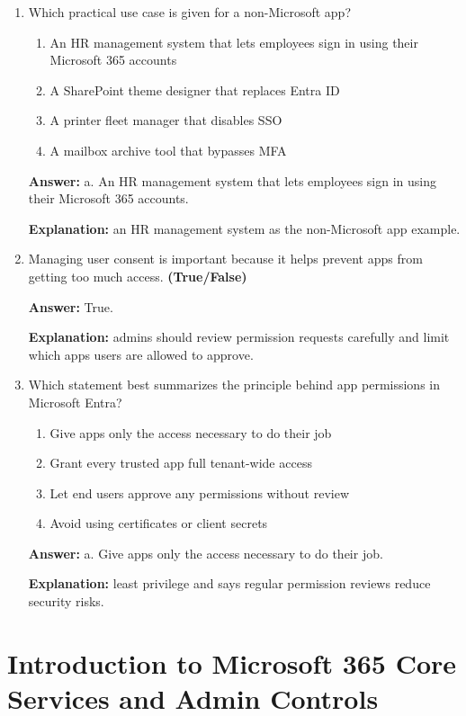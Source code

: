 \documentclass[10pt]{article}
\begin{document}
\begin{enumerate}[leftmargin=*]
\item Which practical use case is given for a non-Microsoft app?
\begin{enumerate}[label=\alph*., leftmargin=1.5em]
\item An HR management system that lets employees sign in using their Microsoft 365 accounts
\item A SharePoint theme designer that replaces Entra ID
\item A printer fleet manager that disables SSO
\item A mailbox archive tool that bypasses MFA
\end{enumerate}
\textbf{Answer:} a. An HR management system that lets employees sign in using their Microsoft 365 accounts.

\textbf{Explanation:} an HR management system as the non-Microsoft app example.

\item Managing user consent is important because it helps prevent apps from getting too much access. \textbf{(True/False)}

\textbf{Answer:} True.

\textbf{Explanation:} admins should review permission requests carefully and limit which apps users are allowed to approve.

\item Which statement best summarizes the principle behind app permissions in Microsoft Entra?
\begin{enumerate}[label=\alph*., leftmargin=1.5em]
\item Give apps only the access necessary to do their job
\item Grant every trusted app full tenant-wide access
\item Let end users approve any permissions without review
\item Avoid using certificates or client secrets
\end{enumerate}
\textbf{Answer:} a. Give apps only the access necessary to do their job.

\textbf{Explanation:} least privilege and says regular permission reviews reduce security risks.

\end{enumerate}

\clearpage
\section{Introduction to Microsoft 365 Core Services and Admin Controls}
\clearpage
\end{document}
